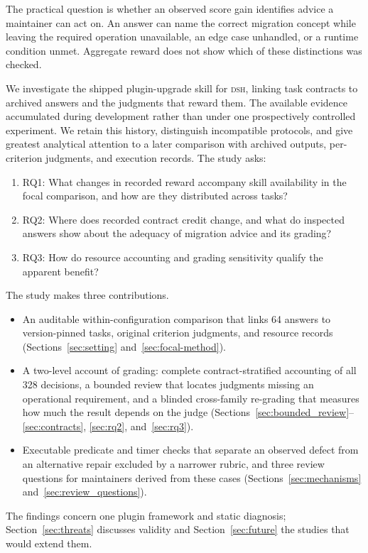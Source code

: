 \documentclass[11pt]{article}
\newcommand{\framework}{\textsc{dsh}}
\begin{document}
The practical question is whether an observed score gain identifies advice a maintainer can act on. An answer can name the correct migration concept while leaving the required operation unavailable, an edge case unhandled, or a runtime condition unmet. Aggregate reward does not show which of these distinctions was checked.

We investigate the shipped plugin-upgrade skill for \framework{}, linking task contracts to archived answers and the judgments that reward them. The available evidence accumulated during development rather than under one prospectively controlled experiment. We retain this history, distinguish incompatible protocols, and give greatest analytical attention to a later comparison with archived outputs, per-criterion judgments, and execution records. The study asks:
\begin{enumerate}
\item RQ1: What changes in recorded reward accompany skill availability in the focal comparison, and how are they distributed across tasks?
\item RQ2: Where does recorded contract credit change, and what do inspected answers show about the adequacy of migration advice and its grading?
\item RQ3: How do resource accounting and grading sensitivity qualify the apparent benefit?
\end{enumerate}

The study makes three contributions.
\begin{itemize}
\item An auditable within-configuration comparison that links 64 answers to version-pinned tasks, original criterion judgments, and resource records (Sections~\ref{sec:setting} and~\ref{sec:focal-method}).
\item A two-level account of grading: complete contract-stratified accounting of all 328 decisions, a bounded review that locates judgments missing an operational requirement, and a blinded cross-family re-grading that measures how much the result depends on the judge (Sections~\ref{sec:bounded_review}--\ref{sec:contracts}, \ref{sec:rq2}, and~\ref{sec:rq3}).
\item Executable predicate and timer checks that separate an observed defect from an alternative repair excluded by a narrower rubric, and three review questions for maintainers derived from these cases (Sections~\ref{sec:mechanisms} and~\ref{sec:review_questions}).
\end{itemize}
The findings concern one plugin framework and static diagnosis; Section~\ref{sec:threats} discusses validity and Section~\ref{sec:future} the studies that would extend them.
\end{document}
